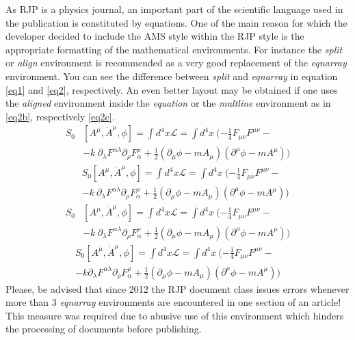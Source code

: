 \documentclass[myclassdoc,debug]{rjparticle}
\begin{document}
As RJP is a physics journal, an important part of the scientific language used in the publication is constituted by equations. One of the main reason for which the developer decided to include the AMS style within the RJP style is the appropriate formatting of the mathematical environments. For instance the \textit{split} or \textit {align} environment is recommended as a very good replacement of the \textit{eqnarray} environment. You can see the difference between \textit{split} and \textit{eqnarray} in equation \eqref{eq1} and \eqref{eq2}, respectively. An even better layout may be obtained if one uses the 
\textit{aligned} environment inside the \textit{equation} or the \textit{multline} environment as in \eqref{eq2b}, respectively \eqref{eq2c}.
\begin{equation}\label{eq1}\begin{split}
S_{0}&[A^{\mu },\dot{A}^\mu,\phi ]=\int d^{4}x\mathcal{L}=\int
d^{4}x\ (-\frac{1}{4}F_{\mu \nu }F^{\mu \nu }- \\
&-k~\partial _{\lambda }F^{\alpha \lambda }\partial _{\rho }F_{\alpha }^{\rho
}+\frac{1}{2}(\partial _{\mu }\phi -mA_{\mu })(\partial ^{\mu }\phi -mA^{\mu
}))
\end{split}\end{equation}
\begin{eqnarray}
& &S_{0}[A^{\mu },\dot{A}^\mu,\phi ]=\int d^{4}x\mathcal{L}=\int
d^{4}x\ (-\frac{1}{4}F_{\mu \nu }F^{\mu \nu }- \label{eq2} \\
& &-k~\partial _{\lambda }F^{\alpha \lambda }\partial _{\rho }F_{\alpha }^{\rho
}+\frac{1}{2}(\partial _{\mu }\phi -mA_{\mu })(\partial ^{\mu }\phi -mA^{\mu
})) \nonumber
\end{eqnarray}
\begin{equation}\label{eq2b}\begin{aligned}
S_{0}&[A^{\mu },\dot{A}^\mu,\phi ]=\int d^{4}x\mathcal{L}=\int
d^{4}x\ (-\frac{1}{4}F_{\mu \nu }F^{\mu \nu }- \\
&-k~\partial _{\lambda }F^{\alpha \lambda }\partial _{\rho }F_{\alpha }^{\rho
}+\frac{1}{2}(\partial _{\mu }\phi -mA_{\mu })(\partial ^{\mu }\phi -mA^{\mu
}))
\end{aligned}\end{equation}
\begin{multline}\label{eq2c}
S_{0}[A^{\mu },\dot{A}^\mu,\phi ]=\int d^{4}x\mathcal{L}=\int
d^{4}x\ (-\frac{1}{4}F_{\mu \nu }F^{\mu \nu }- \\
-k \partial _{\lambda }F^{\alpha \lambda }\partial _{\rho }F_{\alpha }^{\rho
}+\frac{1}{2}(\partial _{\mu }\phi -mA_{\mu })(\partial ^{\mu }\phi -mA^{\mu
}))
\end{multline}
Please, be advised that since 2012 the RJP document class issues errors whenever more than 3 \textit{eqnarray} environments are encountered in one section of an article! This measure was required due to abusive use of this environment which hinders the processing of documents before publishing.
\end{document}
